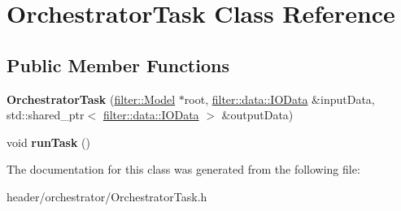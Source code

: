 \hypertarget{class_orchestrator_task}{}\section{Orchestrator\+Task Class Reference}
\label{class_orchestrator_task}
\subsection*{Public Member Functions}
\begin{DoxyCompactItemize}
\item 
\mbox{\label{class_orchestrator_task_a2650ef3a5d98d322c38cb2f29c1e7e8e}} 
{\bfseries Orchestrator\+Task} (\hyperlink{classfilter_1_1_model}{filter\+::\+Model} $\ast$root, \hyperlink{classfilter_1_1data_1_1_i_o_data}{filter\+::data\+::\+I\+O\+Data} \&input\+Data, std\+::shared\+\_\+ptr$<$ \hyperlink{classfilter_1_1data_1_1_i_o_data}{filter\+::data\+::\+I\+O\+Data} $>$ \&output\+Data)
\item 
\mbox{\label{class_orchestrator_task_a898e91604637f795cd388986a9615f5c}} 
void {\bfseries run\+Task} ()
\end{DoxyCompactItemize}


The documentation for this class was generated from the following file\+:\begin{DoxyCompactItemize}
\item 
header/orchestrator/Orchestrator\+Task.\+h\end{DoxyCompactItemize}
